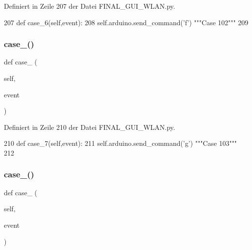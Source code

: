 Definiert in Zeile 207 der Datei F\+I\+N\+A\+L\+\_\+\+G\+U\+I\+\_\+\+W\+L\+A\+N.\+py.


\begin{DoxyCode}
207     \textcolor{keyword}{def }case\_6(self,event):
208         self.arduino.send\_command(\textcolor{stringliteral}{'f'})  \textcolor{stringliteral}{"""Case 102"""}
209     
\end{DoxyCode}
\mbox{\label{class_f_i_n_a_l___g_u_i___w_l_a_n_1_1_w_l_a_n_a32a43998c22b533d37d0f33e396ec854}} 
\subsubsection{\texorpdfstring{case\+\_()}{case\_7()}}
{\footnotesize\ttfamily def case\+\_ (\begin{DoxyParamCaption}\item[{}]{self,  }\item[{}]{event }\end{DoxyParamCaption})}



Definiert in Zeile 210 der Datei F\+I\+N\+A\+L\+\_\+\+G\+U\+I\+\_\+\+W\+L\+A\+N.\+py.


\begin{DoxyCode}
210     \textcolor{keyword}{def }case\_7(self,event):
211         self.arduino.send\_command(\textcolor{stringliteral}{'g'})  \textcolor{stringliteral}{"""Case 103"""}
212         
\end{DoxyCode}
\mbox{\label{class_f_i_n_a_l___g_u_i___w_l_a_n_1_1_w_l_a_n_a780ab1218c323b1542a37be09f955196}} 
\subsubsection{\texorpdfstring{case\+\_()}{case\_8()}}
{\footnotesize\ttfamily def case\+\_ (\begin{DoxyParamCaption}\item[{}]{self,  }\item[{}]{event }\end{DoxyParamCaption})}



